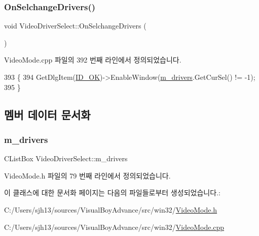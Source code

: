 \subsubsection{\texorpdfstring{On\+Selchange\+Drivers()}{OnSelchangeDrivers()}}
{\footnotesize\ttfamily void Video\+Driver\+Select\+::\+On\+Selchange\+Drivers (\begin{DoxyParamCaption}{ }\end{DoxyParamCaption})\hspace{0.3cm}{\ttfamily [protected]}}



Video\+Mode.\+cpp 파일의 392 번째 라인에서 정의되었습니다.


\begin{DoxyCode}
393 \{
394     GetDlgItem(\mbox{\hyperlink{resource_8h_a4cf7b8af561e85b223c39c4c2b22ef18}{ID\_OK}})->EnableWindow(\mbox{\hyperlink{class_video_driver_select_a6f3953363969c0e8a4c52f6247fb41d9}{m\_drivers}}.GetCurSel() != -1);
395 \}
\end{DoxyCode}


\subsection{멤버 데이터 문서화}
\mbox{\label{class_video_driver_select_a6f3953363969c0e8a4c52f6247fb41d9}} 
\subsubsection{\texorpdfstring{m\+\_\+drivers}{m\_drivers}}
{\footnotesize\ttfamily C\+List\+Box Video\+Driver\+Select\+::m\+\_\+drivers}



Video\+Mode.\+h 파일의 79 번째 라인에서 정의되었습니다.



이 클래스에 대한 문서화 페이지는 다음의 파일들로부터 생성되었습니다.\+:\begin{DoxyCompactItemize}
\item 
C\+:/\+Users/sjh13/sources/\+Visual\+Boy\+Advance/src/win32/\mbox{\hyperlink{_video_mode_8h}{Video\+Mode.\+h}}\item 
C\+:/\+Users/sjh13/sources/\+Visual\+Boy\+Advance/src/win32/\mbox{\hyperlink{_video_mode_8cpp}{Video\+Mode.\+cpp}}\end{DoxyCompactItemize}
